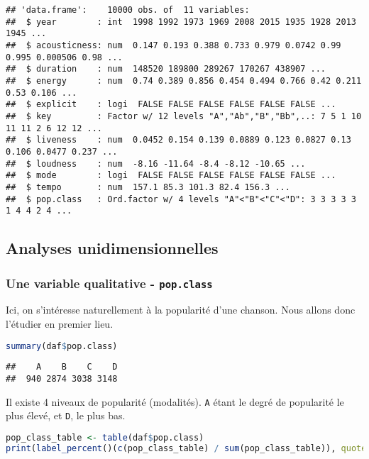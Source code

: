 \documentclass[
  11pt,
  xcolor = usenames,dvipsnames]{article}
\newcommand{\passthrough}[1]{#1}
\begin{document}
\begin{lstlisting}
## 'data.frame':    10000 obs. of  11 variables:
##  $ year        : int  1998 1992 1973 1969 2008 2015 1935 1928 2013 1945 ...
##  $ acousticness: num  0.147 0.193 0.388 0.733 0.979 0.0742 0.99 0.995 0.000506 0.98 ...
##  $ duration    : num  148520 189800 289267 170267 438907 ...
##  $ energy      : num  0.74 0.389 0.856 0.454 0.494 0.766 0.42 0.211 0.53 0.106 ...
##  $ explicit    : logi  FALSE FALSE FALSE FALSE FALSE FALSE ...
##  $ key         : Factor w/ 12 levels "A","Ab","B","Bb",..: 7 5 1 10 11 11 2 6 12 12 ...
##  $ liveness    : num  0.0452 0.154 0.139 0.0889 0.123 0.0827 0.13 0.106 0.0477 0.237 ...
##  $ loudness    : num  -8.16 -11.64 -8.4 -8.12 -10.65 ...
##  $ mode        : logi  FALSE FALSE FALSE FALSE FALSE FALSE ...
##  $ tempo       : num  157.1 85.3 101.3 82.4 156.3 ...
##  $ pop.class   : Ord.factor w/ 4 levels "A"<"B"<"C"<"D": 3 3 3 3 3 1 4 4 2 4 ...
\end{lstlisting}

\hypertarget{analyses-unidimensionnelles}{%
\subsection{Analyses unidimensionnelles}\label{analyses-unidimensionnelles}}

\hypertarget{une-variable-qualitative---pop.class}{%
\subsubsection{\texorpdfstring{Une variable qualitative - \texttt{pop.class}}{Une variable qualitative - pop.class}}\label{une-variable-qualitative---pop.class}}

Ici, on s'intéresse naturellement à la popularité d'une chanson. Nous allons donc l'étudier en premier lieu.

\begin{lstlisting}[language=R]
summary(daf$pop.class)
\end{lstlisting}

\begin{lstlisting}
##    A    B    C    D 
##  940 2874 3038 3148
\end{lstlisting}

Il existe 4 niveaux de popularité (modalités). \passthrough{\lstinline!A!} étant le degré de popularité le plus élevé, et \passthrough{\lstinline!D!}, le plus bas.

\begin{lstlisting}[language=R]
pop_class_table <- table(daf$pop.class)
print(label_percent()(c(pop_class_table) / sum(pop_class_table)), quote = F)
\end{lstlisting}
\end{document}
